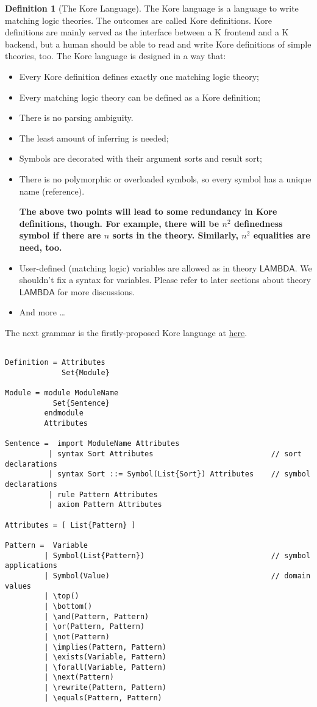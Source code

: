 \documentclass{article}
\newcommand{\comment}[1]
    {\par {\bfseries \color{blue} #1 \par}} %
\newcounter{thmcounter}
\theoremstyle{plain}
\theoremstyle{definition}
\newtheorem{definition}[thmcounter]{Definition}
\theoremstyle{remark}
\newcommand{\LAMBDA}{\mathsf{LAMBDA}}
\begin{document}
\begin{definition}[The Kore Language]
The Kore language is a language to write matching logic theories. The outcomes are called Kore definitions. Kore definitions are mainly served as the interface between a K frontend and a K backend, but a human should be able to read and write Kore definitions of simple theories, too. The Kore language is designed in a way that:
\begin{itemize}
\item Every Kore definition defines exactly one matching logic theory;
\item Every matching logic theory can be defined as a Kore definition;
\item There is no parsing ambiguity.
\item The least amount of inferring is needed;
\item Symbols are decorated with their argument sorts and result sort;
\item There is no polymorphic or overloaded symbols, so every symbol has a unique name (reference). 
\comment{The above two points will lead to some redundancy in Kore definitions, though. For example, there will be $n^2$ definedness symbol if there are $n$ sorts in the theory. Similarly, $n^2$ equalities are need, too.}
\item User-defined (matching logic) variables are allowed as in theory $\LAMBDA$. We shouldn't fix a syntax for variables. Please refer to later sections about theory $\LAMBDA$ for more discussions.
\item And more \dots
\end{itemize}

The next grammar is the firstly-proposed Kore language at \href{https://github.com/kframework/kore/wiki/KORE-Language-Syntax}{\underline{here}}.
\begin{Verbatim}[fontsize=\small]

Definition = Attributes
             Set{Module}

Module = module ModuleName
           Set{Sentence}
         endmodule
         Attributes

Sentence =  import ModuleName Attributes
          | syntax Sort Attributes                           // sort declarations
          | syntax Sort ::= Symbol(List{Sort}) Attributes    // symbol declarations
          | rule Pattern Attributes
          | axiom Pattern Attributes

Attributes = [ List{Pattern} ]

Pattern =  Variable
         | Symbol(List{Pattern})                             // symbol applications
         | Symbol(Value)                                     // domain values
         | \top()
         | \bottom()
         | \and(Pattern, Pattern)
         | \or(Pattern, Pattern)
         | \not(Pattern)
         | \implies(Pattern, Pattern)
         | \exists(Variable, Pattern)
         | \forall(Variable, Pattern)
         | \next(Pattern)
         | \rewrite(Pattern, Pattern)
         | \equals(Pattern, Pattern)


\end{Verbatim}
\end{definition}
\end{document}
